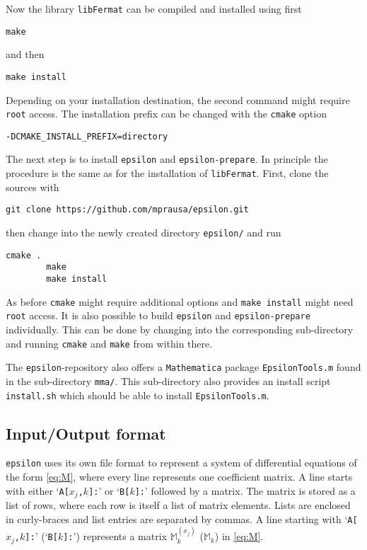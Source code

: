 \documentclass[12pt]{article}
\numberwithin{equation}{section}
\numberwithin{figure}{section}
\newcommand{\M}{\mathds{M}}
\begin{document}
      Now the library \texttt{libFermat} can be compiled and installed using first
      \begin{lstlisting}[basicstyle=\ttfamily,xleftmargin=-4em]
        make
      \end{lstlisting}
      and then
      \begin{lstlisting}[basicstyle=\ttfamily,xleftmargin=-4em]
        make install
      \end{lstlisting}
      Depending on your installation destination, the second command might require \texttt{root} access.
      The installation prefix can be changed with the \texttt{cmake} option 
      \begin{lstlisting}[basicstyle=\ttfamily,xleftmargin=-4em]
        -DCMAKE_INSTALL_PREFIX=directory
      \end{lstlisting}
      The next step is to install \texttt{epsilon} and \texttt{epsilon-prepare}.
      In principle the procedure is the same as for the installation of \texttt{libFermat}.
      First, clone the sources with
      \begin{lstlisting}[basicstyle=\ttfamily,xleftmargin=-4em]
        git clone https://github.com/mprausa/epsilon.git
      \end{lstlisting}
      then change into the newly created directory \texttt{epsilon/} and run
      \begin{lstlisting}[basicstyle=\ttfamily,xleftmargin=-4em]
        cmake .
        make
        make install
      \end{lstlisting}
      As before \texttt{cmake} might require additional options and \texttt{make install} might need \texttt{root} access.
      It is also possible to build \texttt{epsilon} and \texttt{epsilon-prepare} individually.
      This can be done by changing into the corresponding sub-directory and running \texttt{cmake} and \texttt{make} from within there.

      The \texttt{epsilon}-repository also offers a \texttt{Mathematica} package \texttt{EpsilonTools.m}  found in the sub-directory \texttt{mma/}.
      This sub-directory also provides an install script \texttt{install.sh} which should be able to install \texttt{EpsilonTools.m}.
    \subsection{Input/Output format} \label{sect:format}
      \texttt{epsilon} uses its own file format to represent a system of differential equations of the form \eqref{eq:M}, where every line represents one coefficient matrix.
      A line starts with either `\texttt{A[$x_j$,$k$]:}' or `\texttt{B[$k$]:}' followed by a matrix.
      The matrix is stored as a list of rows, where each row is itself a list of matrix elements.
      Lists are enclosed in curly-braces and list entries are separated by commas.
      A line starting with `\texttt{A[$x_j$,$k$]:}' (`\texttt{B[$k$]:}') represents a matrix $\M^{(x_j)}_k$ ($\M_k$) in \eqref{eq:M}.
\end{document}
